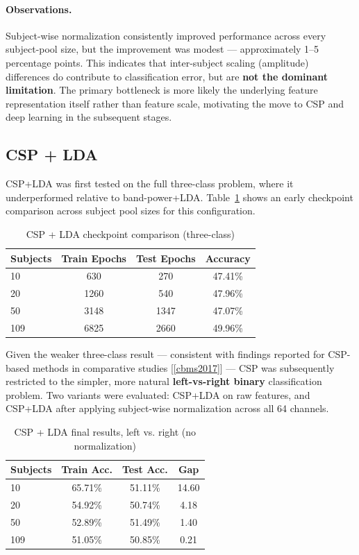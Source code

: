 \documentclass[11pt,a4paper]{article}
\renewcommand{\cite}[1]{[\ref{#1}]}
\begin{document}
\paragraph{Observations.} Subject-wise normalization consistently improved performance across every subject-pool size, but the improvement was modest --- approximately 1--5 percentage points. This indicates that inter-subject scaling (amplitude) differences do contribute to classification error, but are \textbf{not the dominant limitation}. The primary bottleneck is more likely the underlying feature representation itself rather than feature scale, motivating the move to CSP and deep learning in the subsequent stages.

\subsection{CSP + LDA}
CSP+LDA was first tested on the full three-class problem, where it underperformed relative to band-power+LDA. Table~\ref{tab:csp-checkpoint} shows an early checkpoint comparison across subject pool sizes for this configuration.

\begin{table}[h!]
\centering
\caption{CSP + LDA checkpoint comparison (three-class)}
\label{tab:csp-checkpoint}
\begin{tabular}{lccc}
\toprule
\textbf{Subjects} & \textbf{Train Epochs} & \textbf{Test Epochs} & \textbf{Accuracy} \\
\midrule
10  & 630  & 270  & 47.41\% \\
20  & 1260 & 540  & 47.96\% \\
50  & 3148 & 1347 & 47.07\% \\
109 & 6825 & 2660 & 49.96\% \\
\bottomrule
\end{tabular}
\end{table}

Given the weaker three-class result --- consistent with findings reported for CSP-based methods in comparative studies \cite{cbms2017} --- CSP was subsequently restricted to the simpler, more natural \textbf{left-vs-right binary} classification problem. Two variants were evaluated: CSP+LDA on raw features, and CSP+LDA after applying subject-wise normalization across all 64 channels.

\begin{table}[h!]
\centering
\caption{CSP + LDA final results, left vs. right (no normalization)}
\label{tab:csp-final-1}
\begin{tabular}{lccc}
\toprule
\textbf{Subjects} & \textbf{Train Acc.} & \textbf{Test Acc.} & \textbf{Gap} \\
\midrule
10  & 65.71\% & 51.11\% & 14.60 \\
20  & 54.92\% & 50.74\% & 4.18 \\
50  & 52.89\% & 51.49\% & 1.40 \\
109 & 51.05\% & 50.85\% & 0.21 \\
\bottomrule
\end{tabular}
\end{table}
\end{document}
